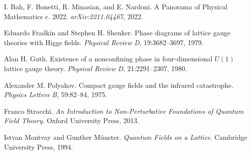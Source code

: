 \documentclass[11pt]{amsart}
\begin{document}
\begin{thebibliography}{99}
I. Bah, F. Bonetti, R. Minasian, and E. Nardoni.
A Panorama of Physical Mathematics c. 2022.
\emph{arXiv:2211.04467}, 2022.

Eduardo Fradkin and Stephen H. Shenker.
Phase diagrams of lattice gauge theories with Higgs fields.
\emph{Physical Review D}, 19:3682--3697, 1979.

Alan H. Guth.
Existence of a nonconfining phase in four-dimensional $U(1)$ lattice gauge theory.
\emph{Physical Review D}, 21:2291--2307, 1980.

Alexander M. Polyakov.
Compact gauge fields and the infrared catastrophe.
\emph{Physics Letters B}, 59:82--84, 1975.

Franco Strocchi.
\emph{An Introduction to Non-Perturbative Foundations of Quantum Field Theory}.
Oxford University Press, 2013.

Istvan Montvay and Gunther Münster.
\emph{Quantum Fields on a Lattice}.
Cambridge University Press, 1994.

\end{thebibliography}
\end{document}
